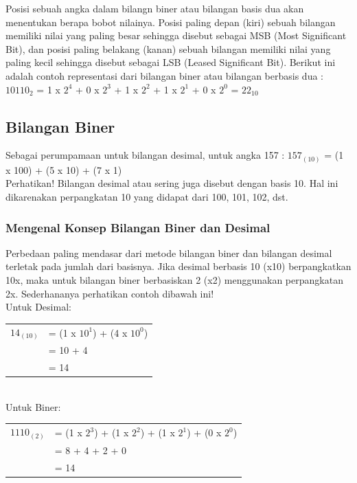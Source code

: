 Posisi sebuah angka dalam bilangn biner atau bilangan basis dua akan menentukan berapa bobot nilainya. Posisi paling depan (kiri) sebuah bilangan memiliki nilai yang paling besar sehingga disebut sebagai MSB (Most Significant Bit), dan posisi paling belakang (kanan) sebuah bilangan memiliki nilai yang paling kecil sehingga disebut sebagai LSB (Leased Significant Bit). Berikut ini adalah contoh representasi dari bilangan biner atau bilangan berbasis dua :
$10110_2$ = 1 x $2^4$ + 0 x $2^3$ + 1 x $2^2$ + 1 x $2^1$ + 0 x $2^0$ = $22_{10}$

\subsection{Bilangan Biner}
\qquad Sebagai perumpamaan untuk bilangan desimal, untuk angka 157 : $157_{(10)}$ = (1 x 100) + (5 x 10) + (7 x 1) \\

Perhatikan! Bilangan desimal atau sering juga disebut dengan basis 10. Hal ini dikarenakan perpangkatan 10 yang didapat dari 100, 101, 102, dst.

\subsubsection{Mengenal Konsep Bilangan Biner dan Desimal}
\qquad Perbedaan paling mendasar dari metode bilangan biner dan bilangan desimal terletak pada jumlah dari basisnya. Jika desimal berbasis 10 (x10) berpangkatkan 10x, maka untuk bilangan biner berbasiskan 2 (x2) menggunakan perpangkatan 2x.
Sederhananya perhatikan contoh dibawah ini!\\
Untuk Desimal:
\begin{table}[h!]
\begin{tabular}{ l l }
$14_{(10)}$ & = (1 x $10^1$) + (4 x $10^0$)\\
& = 10 + 4\\
& = 14\\
\end{tabular}
\end{table}
\\
Untuk Biner:
\begin{table}[h!]
\begin{tabular}{ l l }
$1110_{(2)}$ & = (1 x $2^3$) + (1 x $2^2$) + (1 x $2^1$) + (0 x $2^0$)\\
& = 8 + 4 + 2 + 0\\
& = 14\\
\end{tabular}
\end{table}

